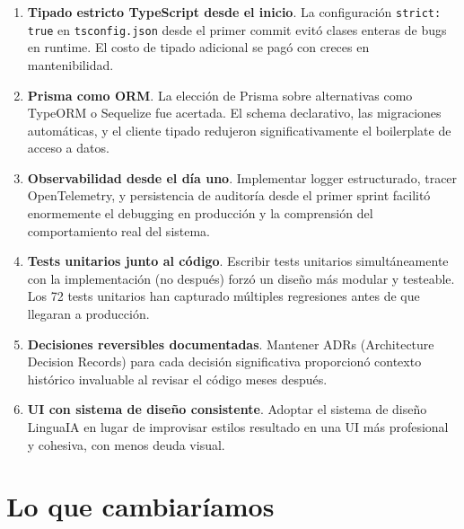 \begin{enumerate}[leftmargin=1.6em]
\item \textbf{Tipado estricto TypeScript desde el inicio}. La configuración \texttt{strict: true} en \texttt{tsconfig.json} desde el primer commit evitó clases enteras de bugs en runtime. El costo de tipado adicional se pagó con creces en mantenibilidad.

\item \textbf{Prisma como ORM}. La elección de Prisma sobre alternativas como TypeORM o Sequelize fue acertada. El schema declarativo, las migraciones automáticas, y el cliente tipado redujeron significativamente el boilerplate de acceso a datos.

\item \textbf{Observabilidad desde el día uno}. Implementar logger estructurado, tracer OpenTelemetry, y persistencia de auditoría desde el primer sprint facilitó enormemente el debugging en producción y la comprensión del comportamiento real del sistema.

\item \textbf{Tests unitarios junto al código}. Escribir tests unitarios simultáneamente con la implementación (no después) forzó un diseño más modular y testeable. Los 72 tests unitarios han capturado múltiples regresiones antes de que llegaran a producción.

\item \textbf{Decisiones reversibles documentadas}. Mantener ADRs (Architecture Decision Records) para cada decisión significativa proporcionó contexto histórico invaluable al revisar el código meses después.

\item \textbf{UI con sistema de diseño consistente}. Adoptar el sistema de diseño LinguaIA en lugar de improvisar estilos resultado en una UI más profesional y cohesiva, con menos deuda visual.
\end{enumerate}

\section{Lo que cambiaríamos}

